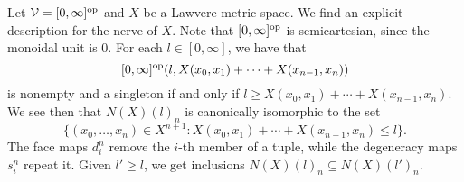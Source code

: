 \begin{example}\label{ex:metric_nerve}
    Let $\mathcal{V} = [0,\infty]^{\mathrm{op}}$ and $X$ be a Lawvere metric space. We find an explicit description for the nerve of $X$. Note that $[0,\infty]^{\mathrm{op}}$ is semicartesian, since the monoidal unit is $0$. For each $l \in [0,\infty]$, we have that
    \[[0,\infty]^{\mathrm{op}}(l, X(x_0,x_1) + \cdots + X(x_{n-1},x_n))\]
    is nonempty and a singleton if and only if $l \geq X(x_0,x_1) + \cdots + X(x_{n-1},x_n)$. We see then that $N(X)(l)_n$ is canonically isomorphic to the set 
    \[\{(x_0,\dots,x_n) \in X^{n+1} : X(x_0,x_1) + \cdots + X(x_{n-1},x_n) \leq l\}.\]
    The face maps $d_i^n$ remove the $i$-th member of a tuple, while the degeneracy maps $s_i^n$ repeat it. Given $l' \geq l$, we get inclusions $N(X)(l)_n \subseteq N(X)(l')_n$.
\end{example}

